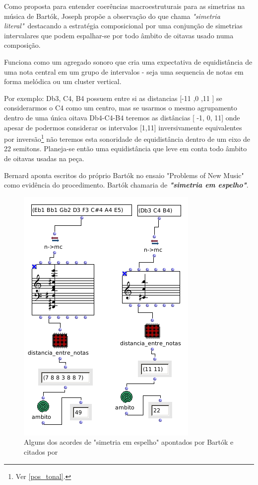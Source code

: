 \documentclass[
	12pt,				%
	openright,			%
	twoside,			%
	a4paper,			%
	english,			%
	french,				%
	spanish,			%
	brazil				%
	]{abntex2}
\begin{document}
Como proposta para entender coerências macroestruturais para as simetrias na música de Bartók, Joseph  propõe a observação do que chama \textit{"simetria literal"}\ destacando a estratégia composicional por uma conjunção de simetrias intervalares que podem espalhar-se por todo âmbito de oitavas usado numa composição.  

Funciona como um  agregado sonoro que cria uma expectativa de equidistância de uma nota central em um grupo de intervalos - seja uma sequencia de notas em forma melódica ou um cluster vertical. 

Por exemplo: { Db3, C4, B4} possuem entre si as distancias [-11 ,0 ,11 ] se considerarmos o C4 como um centro, mas se usarmos o mesmo agrupamento dentro de uma única oitava {Db4-C4-B4} teremos as distâncias [ -1, 0, 11] onde apesar de podermos considerar os intervalos [1,11] inversivamente equivalentes por inversão\footnote{Ver \autoref{pos_tonal}.} não teremos esta sonoridade de equidistância dentro de um eixo de 22 semitons. Planeja-se então uma equidistância que leve em conta todo âmbito de oitavas usadas na peça.

Bernard aponta escritos do próprio Bartók no ensaio "Problems of New Music" como evidência do procedimento. Bartók chamaria de \textit{\textbf{"simetria em espelho"}}.


\begin{figure}[!h]
	\caption{\label{fig_simetrialiteral} Alguns dos acordes de "simetria em espelho" apontados por Bartók e citados por }
	\begin{center}
	    \includegraphics[scale=0.6]{axis/simetria_literal.png}
	\end{center}
\end{figure}
\end{document}
